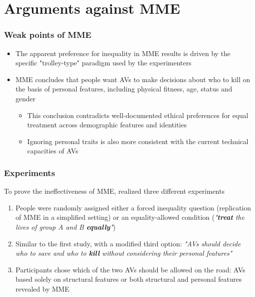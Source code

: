 \documentclass[aspectratio=169]{beamer}
\begin{document}
\section{Arguments against MME}
\begin{frame}
    \frametitle{Weak points of MME}
    \begin{itemize}
        \item The apparent preference for inequality in MME results is driven by the specific "trolley-type" paradigm used by the experimenters
        \item MME concludes that people want AVs to make decisions about who to kill on the basis of personal features, including physical fitness, age, status and gender
              \begin{itemize}
                  \item This conclusion contradicts well-documented ethical preferences for equal treatment across demographic features and identities
                  \item Ignoring personal traits is also more consistent with the current technical capacities of AVs
              \end{itemize}
    \end{itemize}
\end{frame}

\begin{frame}
    \frametitle{Experiments}
    To prove the ineffectiveness of MME, \citeauthor{against-mme} realized three different experiments \cite{against-mme}
    \begin{enumerate}
        \item People were randomly assigned either a forced inequality question (replication of MME in a simplified setting) or an equality-allowed condition (\textit{"\textbf{treat} the lives of group A and B \textbf{equally}"})
        \item Similar to the first study, with a modified third option: \textit{"AVs should decide who to save and who to \textbf{kill} without considering their personal features"}
        \item Participants chose which of the two AVs should be allowed on the road: AVs based solely on structural features or both structural and personal features revealed by MME
    \end{enumerate}
\end{frame}
\end{document}
